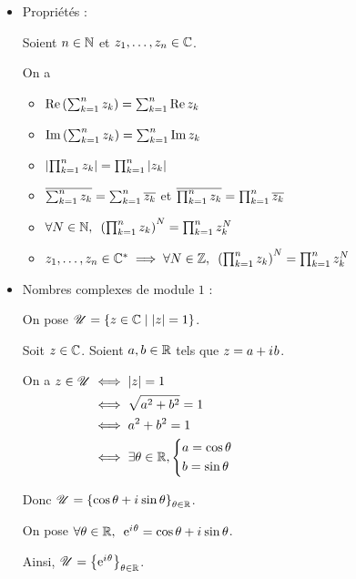 \begin{rappel}
\begin{itemize}
Si \(z_1\not=0\) alors l'inverse de \(z_1\) est l'unique nombre complexe noté \(z_1^{-1}\) vérifiant \(z_1z_1^{-1}=1\).

On remarque \(z_1^{-1}=\dfrac{\conj{z_1}}{\abs{z_1}^2}\) car \(z_1\dfrac{\conj{z_1}}{\abs{z_1}^2}=1\). Donc \(z_1^{-1}=\dfrac{a_1-\i b_1}{a_1^2+b_1^2}\).

On pose \(\quantifs{\forall n\in\N}z_1^n=\underbrace{z_1\times z_1\times\dots\times z_1}_\text{$n$ facteurs}=\prod_{k=1}^nz_1\).

Si \(z_1\not=0\) on pose aussi \(\quantifs{\forall n\in\N}z_1^{-n}=\dfrac{1}{z_1^n}\).

\item Propriétés :

Soient \(n\in\mathbb{N}\) et \(z_1,\dots,z_n\in\mathbb{C}\).

On a \begin{itemize}
\item \(\operatorname{Re}\left(\sum_{k=1}^nz_k\right)=\sum_{k=1}^{n}\operatorname{Re} z_k\)

\item \(\operatorname{Im}\left(\sum_{k=1}^nz_k\right)=\sum_{k=1}^{n}\operatorname{Im} z_k\)

\item \(\left\lvert\prod_{k=1}^nz_k\right\rvert=\prod_{k=1}^n\left\lvert z_k\right\rvert\)

\item \(\overline{\sum_{k=1}^nz_k}=\sum_{k=1}^n\overline{z_k}\) et \(\overline{\prod_{k=1}^nz_k}=\prod_{k=1}^n\overline{z_k}\)

\item \(\quantifs{\forall N\in\N}\paren{\prod_{k=1}^nz_k}^N=\prod_{k=1}^nz_k^N\)

\item \(z_1,\dots,z_n\in\Cs\imp\quantifs{\forall N\in\Z}\paren{\prod_{k=1}^nz_k}^N=\prod_{k=1}^nz_k^N\)
\end{itemize}

\item Nombres complexes de module \(1\) :

On pose \(\mathscr{U}=\left\lbrace z\in\mathbb{C}\;\middle|\;\left\lvert z\right\rvert=1\right\rbrace\).

Soit \(z\in\mathbb{C}\). Soient \(a,b\in\mathbb{R}\) tels que \(z=a+i\mkern1mu b\).

On a \(\begin{aligned}[t]
z\in\mathscr{U}&\iff\left\lvert z\right\rvert=1 \\
&\iff\sqrt{a^2+b^2}=1 \\
&\iff a^2+b^2=1 \\
&\iff\exists\theta\in\mathbb{R},\begin{dcases}a=\cos\theta \\ b=\sin\theta\end{dcases}
\end{aligned}\)

Donc \(\mathscr{U}=\left\lbrace\cos\theta+i\mkern1mu\sin\theta\right\rbrace_{\theta\in\mathbb{R}}\).

On pose \(\quantifs{\forall\theta\in\R}\e{\i\theta}=\cos\theta+\i\sin\theta\).

Ainsi, \(\mathscr{U}=\left\lbrace\mathrm{e}^{i\mkern1mu\theta}\right\rbrace_{\theta\in\mathbb{R}}\).
\end{itemize}
\end{rappel}

